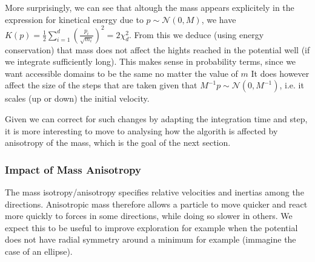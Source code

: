 \documentclass[a4paper, 12pt,oneside]{article}
\begin{document}
			More surprisingly, we can see that altough the mass appears explicitely in the expression for kinetical energy due to $p\sim\mathcal{N}(0,M)$, we have $K(p)=\frac{1}{2}\sum_{i=1}^d \left(\frac{p_i}{\sqrt{m_i}}\right)^2= 2\chi^2_d$. From this we deduce (using energy conservation) that mass does not affect the hights reached in the potential well (if we integrate sufficiently long). This makes sense in probability terms, since we want accessible domains to be the same no matter the value of $m$ 
			It does however affect the size of the steps that are taken given that $M^{-1}p\sim\mathcal{N}(0,M^{-1})$, i.e. it scales (up or down) the initial velocity. 

			Given we can correct for such changes by adapting the integration time and step, it is more interesting to move to analysing how the algorith is affected by anisotropy of the mass, which is the goal of the next section. 
			\subsubsection{Impact of Mass Anisotropy}
			The mass isotropy/anisotropy specifies relative velocities and inertias among the directions. Anisotropic mass therefore allows a particle to move quicker and react more quickly to forces in some directions, while doing so slower in others. We expect this to be useful to improve exploration for example when the potential does not have radial symmetry around a minimum for example (immagine the case of an ellipse). 
\end{document}
